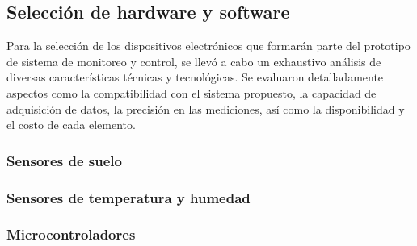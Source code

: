 \subsection{Selección de hardware y software}
Para la selección de los dispositivos electrónicos que formarán parte del prototipo de sistema de monitoreo y control, se llevó a cabo un exhaustivo análisis de diversas características técnicas y tecnológicas. Se evaluaron detalladamente aspectos como la compatibilidad con el sistema propuesto, la capacidad de adquisición de datos, la precisión en las mediciones, así como la disponibilidad y el costo de cada elemento.

\subsubsection*{Sensores de suelo}
\subsubsection*{Sensores de temperatura y humedad }
\subsubsection*{Microcontroladores}